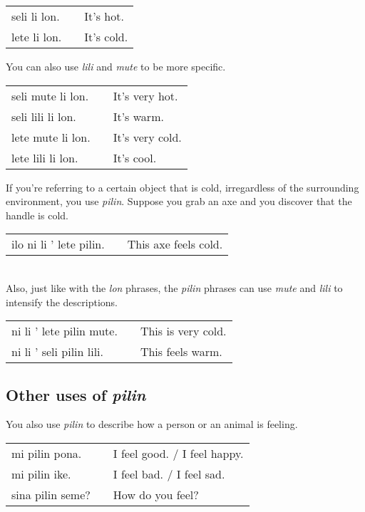 {\begin{supertabular}{p{5,5cm}|ll}
seli li lon. && It's hot. \\
lete li lon. && It's cold. \\
\end{supertabular} 

You can also use \textit{lili} and \textit{mute} to be more specific. 
 
\begin{supertabular}{p{5,5cm}|ll}
seli mute li lon. && It's very hot. \\
seli lili li lon. && It's warm. \\
lete mute li lon. && It's very cold. \\
lete lili li lon. && It's cool. \\
\end{supertabular} 

If you're referring to a certain object that is cold, irregardless of the surrounding environment, you use \textit{pilin}.  
Suppose you grab an axe and you discover that the handle is cold. 

\begin{supertabular}{p{5,5cm}|ll}
ilo ni li ' lete pilin. && This axe feels cold. \\
\end{supertabular} \\

Also, just like with the \textit{lon} phrases, the \textit{pilin} phrases can use \textit{mute} and \textit{lili} to intensify the descriptions. 

\begin{supertabular}{p{5,5cm}|ll}
ni li ' lete pilin mute. && This is very cold. \\
ni li ' seli pilin lili. && This feels warm. \\
\end{supertabular} 
%
\subsection*{Other uses of \textit{pilin}}
%
%
You also use \textit{pilin} to describe how a person or an animal is feeling. 

\begin{supertabular}{p{5,5cm}|ll}
mi pilin pona. && I feel good. / I feel happy. \\
mi pilin ike. && I feel bad. / I feel sad. \\
sina pilin seme? && How do you feel? \\ 
\end{supertabular} 

}
